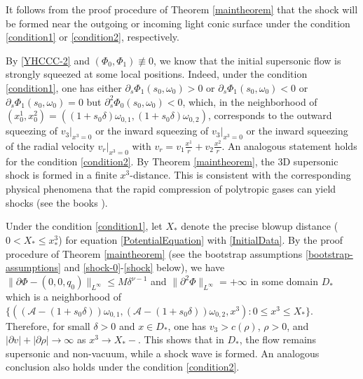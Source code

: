 \documentclass[11pt,twoside]{article}
\def\f{\frac}
\def\p{\partial}
\begin{document}
\begin{remark}\label{aboutcondition}
It follows from the proof procedure of Theorem \ref{maintheorem} that
the shock will be formed near the outgoing or incoming light conic surface
under the condition \eqref{condition1} or \eqref{condition2}, respectively.
\end{remark}


\begin{remark}\label{Yin.0}
By \eqref{YHCCC-2} and $(\Phi_0, \Phi_1)\not\equiv 0$,  we know that the initial supersonic flow is strongly squeezed
at some local positions. Indeed, under the condition \eqref{condition1}, one has either $\p_s\Phi_1(s_0,\omega_0)>0$
or $\p_s\Phi_1(s_0,\omega_0)<0$ or $\p_s\Phi_1(s_0,\omega_0)=0$ but $\p_s^2\Phi_0(s_0,\omega_0)<0$,
which, in the neighborhood of $(x^1_0,x^2_0)=((1+s_0\delta)\omega_{0,1}, (1+s_0\delta)\omega_{0,2})$, corresponds to the outward squeezing of $v_3|_{x^3=0}$ or the inward squeezing of $v_3|_{x^3=0}$
or the inward squeezing of the radial velocity $v_r|_{x^3=0}$ with $v_r=v_1\f{x^1}{r}+v_2\f{x^2}{r}$. An analogous statement
holds for the condition \eqref{condition2}. By Theorem \ref{maintheorem}, the 3D supersonic shock is formed in a finite $x^3$-distance.
This is consistent with the corresponding physical phenomena that the rapid compression of polytropic gases can yield shocks 
(see the books \cite{CF, Bers}).
\end{remark}


\begin{remark}\label{Yin.78}
Under the condition \eqref{condition1}, let $X_*$ denote the precise blowup distance ($0<X_*\le x^3_*$)
for equation \eqref{PotentialEquation} with \eqref{InitialData}.
By the proof procedure of Theorem \ref{maintheorem} (see the bootstrap assumptions \eqref{bootstrap-assumptions}
and \eqref{shock-0}-\eqref{shock} below), we have $\|\p\Phi-(0,0,q_0)\|_{L^{\infty}}\le M\delta^{\nu-1}$ 
and $\|\p^2\Phi\|_{L^{\infty}}=+\infty$ in some domain $D_*$ which is a neighborhood of
$\{((\mathcal A-(1+s_0\delta))\omega_{0,1}, (\mathcal A-(1+s_0\delta))\omega_{0,2}, x^3): 0\le x^3\le X_*\}$. 
Therefore, for small $\delta>0$ and $x\in D_*$,
one has $v_3>c(\rho)$, $\rho>0$,
and $|\p v|+|\p\rho|\to\infty$ as $x^3\to X_*-$.
This shows that in $D_*$, the flow remains supersonic and non-vacuum, while a shock wave is formed. An
analogous conclusion also holds under the condition \eqref{condition2}.
\end{remark}
\end{document}
